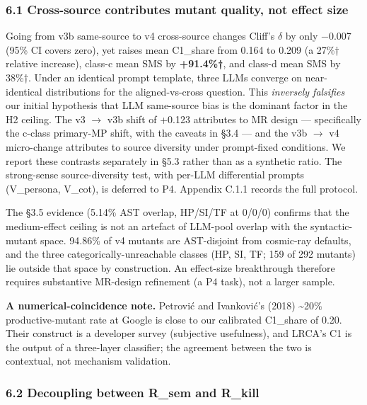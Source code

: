 \documentclass[review,12pt,authoryear]{elsarticle}
\begin{document}
\subsubsection{6.1 Cross-source contributes mutant quality, not effect
size}\label{cross-source-contributes-mutant-quality-not-effect-size}

Going from v3b same-source to v4 cross-source changes Cliff's $\delta$ by only
−0.007 (95\% CI covers zero), yet raises mean C1\_share from 0.164 to
0.209 (a 27\%† relative increase), class-c mean SMS by
\textbf{+91.4\%†}, and class-d mean SMS by 38\%†. Under an identical
prompt template, three LLMs converge on near-identical distributions for
the aligned-vs-cross question. This \emph{inversely falsifies} our
initial hypothesis that LLM same-source bias is the dominant factor in
the H2 ceiling. The v3 $\to$ v3b shift of +0.123 attributes to MR design ---
specifically the c-class primary-MP shift, with the caveats in §3.4 ---
and the v3b $\to$ v4 micro-change attributes to source diversity under
prompt-fixed conditions. We report these contrasts separately in §5.3
rather than as a synthetic ratio. The strong-sense source-diversity
test, with per-LLM differential prompts (V\_persona, V\_cot), is
deferred to P4. Appendix C.1.1 records the full protocol.

The §3.5 evidence (5.14\% AST overlap, HP/SI/TF at 0/0/0) confirms that
the medium-effect ceiling is not an artefact of LLM-pool overlap with
the syntactic-mutant space. 94.86\% of v4 mutants are AST-disjoint from
cosmic-ray defaults, and the three categorically-unreachable classes
(HP, SI, TF; 159 of 292 mutants) lie outside that space by construction.
An effect-size breakthrough therefore requires substantive MR-design
refinement (a P4 task), not a larger sample.

\textbf{A numerical-coincidence note.} Petrović and Ivanković's (2018)
\textasciitilde20\% productive-mutant rate at Google is close to our
calibrated C1\_share of 0.20. Their construct is a developer survey
(subjective usefulness), and LRCA's C1 is the output of a three-layer
classifier; the agreement between the two is contextual, not mechanism
validation.

\subsubsection{6.2 Decoupling between R\_sem and
R\_kill}\label{decoupling-between-r_sem-and-r_kill}
\end{document}
